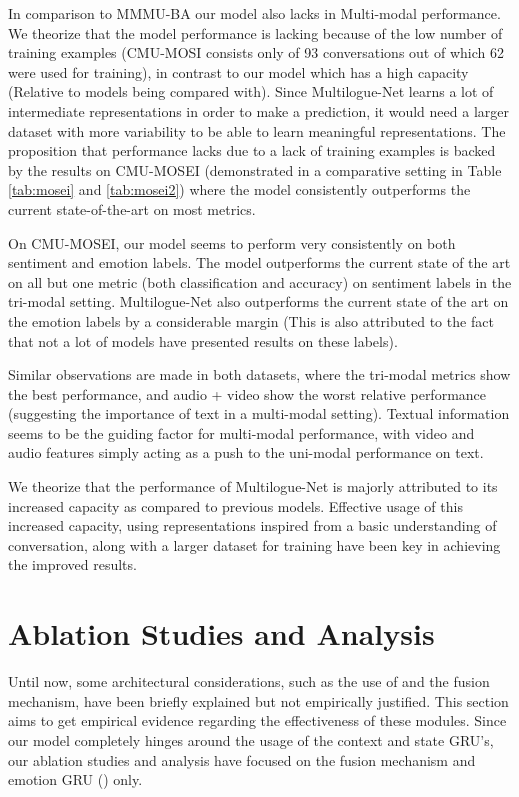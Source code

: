 \documentclass[11pt,a4paper]{article}
\begin{document}
In comparison to MMMU-BA our model also lacks in Multi-modal performance. We theorize that the model performance is lacking because of the low number of training examples (CMU-MOSI consists only of 93 conversations out of which 62 were used for training), in contrast to our model which has a high capacity (Relative to models being compared with). Since Multilogue-Net learns a lot of intermediate representations in order to make a prediction, it would need a larger dataset with more variability to be able to learn meaningful representations. The proposition that performance lacks due to a lack of training examples is backed by the results on CMU-MOSEI (demonstrated in a comparative setting in Table \ref{tab:mosei} and \ref{tab:mosei2}) where the model consistently outperforms the current state-of-the-art on most metrics. 

On CMU-MOSEI, our model seems to perform very consistently on both sentiment and emotion labels. The model outperforms the current state of the art on all but one metric (both classification and accuracy) on sentiment labels in the tri-modal setting. Multilogue-Net also outperforms the current state of the art on the emotion labels by a considerable margin (This is also attributed to the fact that not a lot of models have presented results on these labels).

Similar observations are made in both datasets, where the tri-modal metrics show the best performance, and audio + video show the worst relative performance (suggesting the importance of text in a multi-modal setting). Textual information seems to be the guiding factor for multi-modal performance, with video and audio features simply acting as a push to the uni-modal performance on text. 

We theorize that the performance of Multilogue-Net is majorly attributed to its increased capacity as compared to previous models. Effective usage of this increased capacity, using representations inspired from a basic understanding of conversation, along with a larger dataset for training have been key in achieving the improved results. 


\section{Ablation Studies and Analysis}
Until now, some architectural considerations, such as the use of  and the fusion mechanism, have been briefly explained but not empirically justified. This section aims to get empirical evidence regarding the effectiveness of these modules. Since our model completely hinges around the usage of the context and state GRU's, our ablation studies and analysis have focused on the fusion mechanism and emotion GRU () only. 
\end{document}
